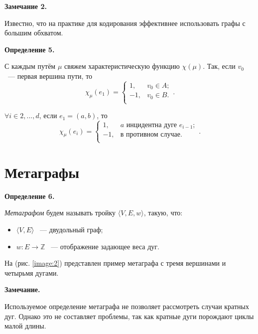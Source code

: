 \documentclass[14pt]{mmcs-article}
\begin{document}
\textbf{Замечание 2.}

Известно, что на практике для кодирования эффективнее использовать графы с большим обхватом.

\textbf{Определение 5.}


С каждым путём $\mu$ свяжем характеристическую функцию $\chi(\mu)$.
Так, если $v_0$ ~--- первая вершина пути, то
\[
    \chi_{\mu}(e_1) =
    \left\{
        \begin{array}{ll}
        1,  & v_0 \in A;\\
        -1, & v_0 \in B. \\
        \end{array}
    \right..
\]

$\forall i \in 2, ..., d$, если $e_1 = (a, b)$, то
\[
    \chi_{\mu}(e_i) =
    \left\{
        \begin{array}{ll}
        1,  & a \text{ инцидентна дуге } e_{i-1};\\
        -1, & \text{в противном случае}. \\
        \end{array}
    \right..
\]

\pagebreak
\section*{Метаграфы}

\textbf{Определение 6.}

\textsl{Метаграфом} будем называть тройку $\langle V,E,w \rangle$, такую, что:

\begin{itemize}
    \item $\langle V,E \rangle$ ~--- двудольный граф;
    \item $w: E \rightarrow \mathbb{Z}$ ~--- отображение задающее веса дуг.
\end{itemize}

На (рис. \ref{image:2}) представлен пример метаграфа с тремя вершинами и четырьмя дугами.

\textbf{Замечание.}

Используемое определение метаграфа не позволяет рассмотреть случаи кратных дуг. Однако это не составляет проблемы, так как кратные дуги порождают циклы малой длины.

\end{document}
